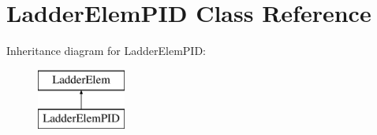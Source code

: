 \hypertarget{class_ladder_elem_p_i_d}{\section{Ladder\-Elem\-P\-I\-D Class Reference}
\label{class_ladder_elem_p_i_d}
}
Inheritance diagram for Ladder\-Elem\-P\-I\-D\-:\begin{figure}[H]
\begin{center}
\leavevmode
\includegraphics[height=2.000000cm]{class_ladder_elem_p_i_d}
\end{center}
\end{figure}
